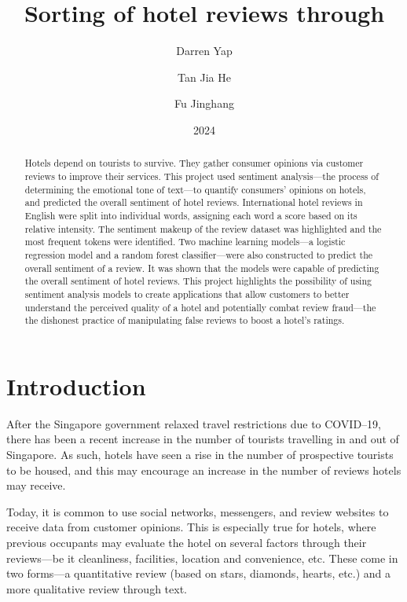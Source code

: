 \documentclass[12pt, twoside, a4paper, draft]{pancake-article}
\title{Sorting \accc{sentiments} of hotel reviews through \accc{machine learning}}
\author{Darren Yap \and Tan Jia He \and Fu Jinghang}
\date{2024}
\begin{document}
\maketitle
\tableofcontents

\begin{abstract}
	Hotels depend on tourists to survive. They gather consumer opinions via customer
	reviews to improve their services. This project used sentiment analysis---the
	process of determining the emotional tone of text---to quantify consumers'
	opinions on hotels, and predicted the overall sentiment of hotel reviews.
	International hotel reviews in English were split into individual words,
	assigning each word a score based on its relative intensity. The sentiment
	makeup of the review dataset was highlighted and the most frequent tokens were
	identified. Two machine learning models---a logistic regression model and a random
	forest classifier---were also constructed to predict the overall sentiment of a
	review. It was shown that the models were capable of predicting the overall
	sentiment of hotel reviews. This project highlights the possibility of using
	sentiment analysis models to create applications that allow customers to better
	understand the perceived quality of a hotel and potentially combat review fraud---the
	the dishonest practice of manipulating false reviews to boost a hotel's ratings.
\end{abstract}

\section{Introduction}
After the Singapore government relaxed travel restrictions due to COVID--19,
there has been a recent increase in the number of tourists travelling in and out of Singapore.
As such, hotels have seen a rise in the number of prospective tourists to be housed,
and this may encourage an increase in the number of reviews hotels may receive.

Today, it is common to use social networks, messengers, and review websites
to receive data from customer opinions. This is especially true for hotels,
where previous occupants may evaluate the hotel on several factors through their
reviews---be it cleanliness, facilities, location and convenience, etc.
These come in two forms---a quantitative review (based on stars, diamonds,
hearts, etc.) and a more qualitative review through text.
\end{document}
